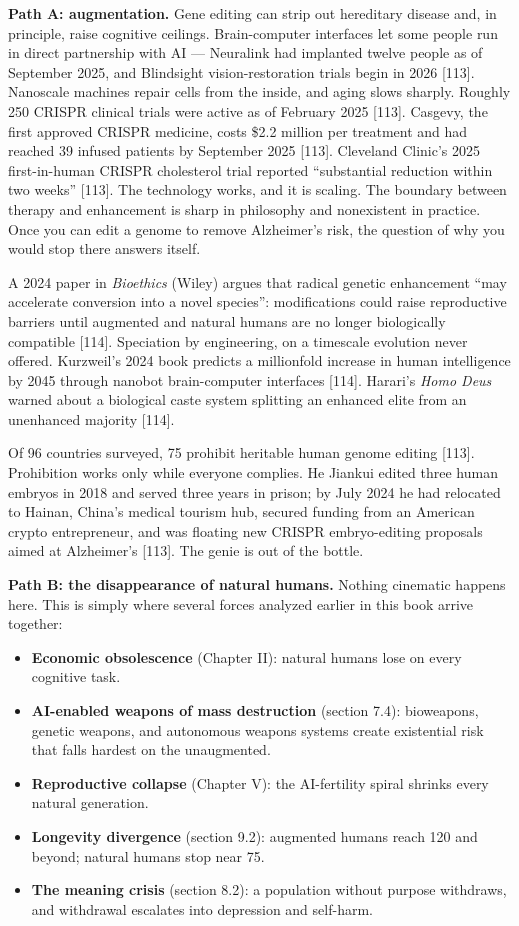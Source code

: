 \documentclass[11pt,a4paper]{article}
\begin{document}
\textbf{Path A: augmentation.} Gene editing can strip out hereditary disease and, in principle, raise cognitive ceilings. Brain-computer interfaces let some people run in direct partnership with AI --- Neuralink had implanted twelve people as of September 2025, and Blindsight vision-restoration trials begin in 2026 [113]. Nanoscale machines repair cells from the inside, and aging slows sharply. Roughly 250 CRISPR clinical trials were active as of February 2025 [113]. Casgevy, the first approved CRISPR medicine, costs \$2.2 million per treatment and had reached 39 infused patients by September 2025 [113]. Cleveland Clinic's 2025 first-in-human CRISPR cholesterol trial reported ``substantial reduction within two weeks'' [113]. The technology works, and it is scaling. The boundary between therapy and enhancement is sharp in philosophy and nonexistent in practice. Once you can edit a genome to remove Alzheimer's risk, the question of why you would stop there answers itself.

A 2024 paper in \textit{Bioethics} (Wiley) argues that radical genetic enhancement ``may accelerate conversion into a novel species'': modifications could raise reproductive barriers until augmented and natural humans are no longer biologically compatible [114]. Speciation by engineering, on a timescale evolution never offered. Kurzweil's 2024 book predicts a millionfold increase in human intelligence by 2045 through nanobot brain-computer interfaces [114]. Harari's \textit{Homo Deus} warned about a biological caste system splitting an enhanced elite from an unenhanced majority [114].

Of 96 countries surveyed, 75 prohibit heritable human genome editing [113]. Prohibition works only while everyone complies. He Jiankui edited three human embryos in 2018 and served three years in prison; by July 2024 he had relocated to Hainan, China's medical tourism hub, secured funding from an American crypto entrepreneur, and was floating new CRISPR embryo-editing proposals aimed at Alzheimer's [113]. The genie is out of the bottle.

\textbf{Path B: the disappearance of natural humans.} Nothing cinematic happens here. This is simply where several forces analyzed earlier in this book arrive together:

\begin{itemize}
  \item \textbf{Economic obsolescence} (Chapter II): natural humans lose on every cognitive task.
  \item \textbf{AI-enabled weapons of mass destruction} (section 7.4): bioweapons, genetic weapons, and autonomous weapons systems create existential risk that falls hardest on the unaugmented.
  \item \textbf{Reproductive collapse} (Chapter V): the AI-fertility spiral shrinks every natural generation.
  \item \textbf{Longevity divergence} (section 9.2): augmented humans reach 120 and beyond; natural humans stop near 75.
  \item \textbf{The meaning crisis} (section 8.2): a population without purpose withdraws, and withdrawal escalates into depression and self-harm.
\end{itemize}
\end{document}
